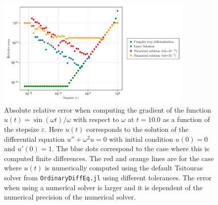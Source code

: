\begin{figure}[tbh]
    \centering
    \includegraphics[width=0.85\textwidth]{../code/finite_differences/finite_difference_derivative.pdf}
    \caption{Absolute relative error when computing the gradient of the function $u(t) = \sin (\omega t)/\omega$ with respect to $\omega$ at $t=10.0$ as a function of the stepsize $\varepsilon$. Here $u(t)$ corresponds to the solution of the differential equation $u'' + \omega^2 u = 0$ with initial condition $u(0)=0$ and $u'(0)=1$. The blue dots correspond to the case where this is computed finite differences. The red and orange lines are for the case where $u(t)$ is numerically computed using the default Tsitouras solver \cite{Tsitouras_2011} from \texttt{OrdinaryDiffEq.jl} using different tolerances. The error when using  a numerical solver is larger and it is dependent of the numerical precision of the numerical solver. }
    \label{fig:finite-diff}
\end{figure}

